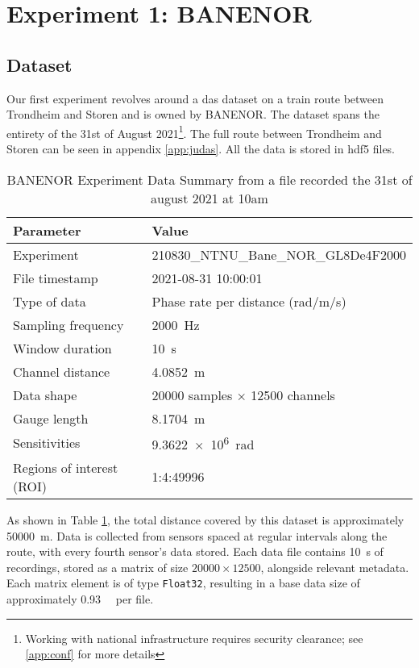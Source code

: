 \section{Experiment 1: BANENOR}

\subsection{Dataset}

Our first experiment revolves around a \acrshort{das} dataset on a train route between Trondheim and Storen and is owned by BANENOR. The dataset spans the entirety of the 31st of August 2021\footnote{Working with national infrastructure requires security clearance; see \ref{app:conf} for more details}. The full route between Trondheim and Storen can be seen in appendix \ref{app:judas}. All the data is stored in \acrshort{hdf5} files.

\begin{table}[!h]
    \centering
    \small
    \begin{tabular}{@{}p{}p{}@{}}
        \toprule
        \textbf{Parameter} & \textbf{Value} \\
        \midrule
        Experiment & 210830\_NTNU\_Bane\_NOR\_GL8De4F2000  \\
        File timestamp & 2021-08-31 10:00:01  \\
        Type of data & Phase rate per distance (rad/m/s) \\
        Sampling frequency & \qty{2000}{\si{\hertz}} \\
        Window duration & \qty{10}{\si{\second}} \\
        Channel distance & \qty{4.0852}{\si{\meter}} \\
        \midrule
        Data shape & 20000 samples \(\times\) 12500 channels  \\
        \midrule
        Gauge length & \qty{8.1704}{ \si{\meter}} \\
        Sensitivities & \qty{9.3622e6}{\si{\radian}
        }\\
        Regions of interest (ROI) & 1:4:49996 \\
        \bottomrule
    \end{tabular}
    \caption{BANENOR Experiment Data Summary from a file recorded the 31st of august 2021 at 10am}
    \label{tab:experiment_data}
\end{table}


As shown in Table \ref{tab:experiment_data}, the total distance covered by this dataset is approximately \qty{50000}{\meter}. Data is collected from sensors spaced at regular intervals along the route, with every fourth sensor's data stored. Each data file contains \qty{10}{\second} of recordings, stored as a matrix of size $20000 \times 12500$, alongside relevant metadata. Each matrix element is of type \texttt{Float32}, resulting in a base data size of approximately \qty{0.93}{\giga\byte} per file. \\

